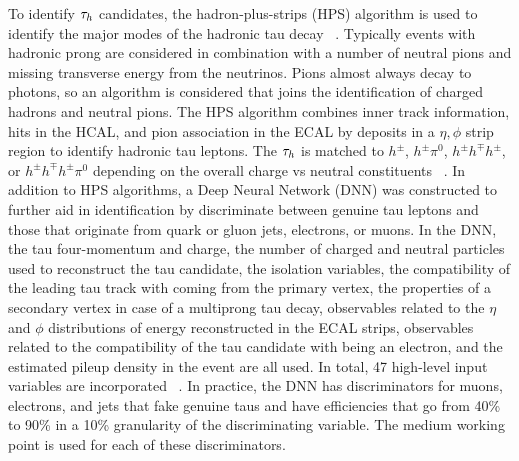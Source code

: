 To identify $\tau_h$ candidates, the hadron-plus-strips (HPS) algorithm is used to identify the major modes of the hadronic tau decay ~\cite{Sirunyan_2018}. Typically events with hadronic prong are considered in combination with a number of neutral pions and missing transverse energy from the neutrinos. Pions almost always decay to photons, so an algorithm is considered that joins the identification of charged hadrons and neutral pions. 
The HPS algorithm combines inner track information, hits in the HCAL, and pion association in the ECAL by deposits in a $\eta,\phi$ strip region to identify hadronic tau leptons. 
The $\tau_h$ is matched to $h^{\pm}$, $h^{\pm}\pi^{0}$, $h^{\pm}h^{\mp}h^{\pm}$, or $h^{\pm}h^{\mp}h^{\pm}\pi^{0}$ depending on the overall charge vs neutral constituents ~\cite{Sirunyan:2018pgf}.
In addition to HPS algorithms, a Deep Neural Network (DNN) was constructed to further aid in identification by discriminate between genuine tau leptons and those that originate from quark or gluon jets, electrons, or muons.  
In the DNN, the tau four-momentum and charge,
the number of charged and neutral particles used to reconstruct the tau candidate,
the isolation variables,
the compatibility of the leading tau track with coming from the primary vertex,
the properties of a secondary vertex in case of a multiprong tau decay,
observables related to the $\eta$ and $\phi$ distributions of energy reconstructed in the ECAL strips,
observables related to the compatibility of the tau candidate with being an electron, 
and the estimated pileup density in the event are all used. In total, 47 high-level input variables are incorporated 
~\cite{https://doi.org/10.48550/arxiv.2201.08458}.
In practice, the DNN has discriminators for muons, electrons, and jets that fake genuine taus and have efficiencies that go from 40\% to 90\% in a 10\% granularity of the discriminating variable. The medium working point is used for each of these discriminators. 


